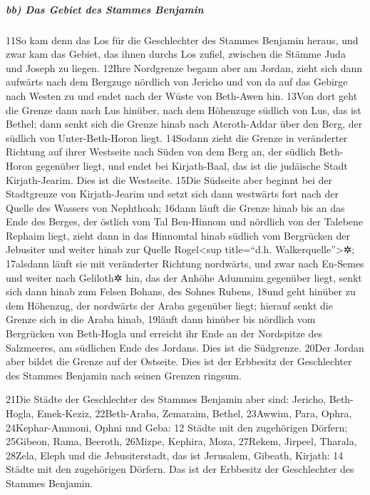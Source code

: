 \hypertarget{bb-das-gebiet-des-stammes-benjamin}{%
\subparagraph{bb) Das Gebiet des Stammes
Benjamin}\label{bb-das-gebiet-des-stammes-benjamin}}

11So kam denn das Los für die Geschlechter des Stammes Benjamin heraus,
und zwar kam das Gebiet, das ihnen durchs Los zufiel, zwischen die
Stämme Juda und Joseph zu liegen. 12Ihre Nordgrenze begann aber am
Jordan, zieht sich dann aufwärts nach dem Bergzuge nördlich von Jericho
und von da auf das Gebirge nach Westen zu und endet nach der Wüste von
Beth-Awen hin. 13Von dort geht die Grenze dann nach Lus hinüber, nach
dem Höhenzuge südlich von Lus, das ist Bethel; dann senkt sich die
Grenze hinab nach Ateroth-Addar über den Berg, der südlich von
Unter-Beth-Horon liegt. 14Sodann zieht die Grenze in veränderter
Richtung auf ihrer Westseite nach Süden von dem Berg an, der südlich
Beth-Horon gegenüber liegt, und endet bei Kirjath-Baal, das ist die
judäische Stadt Kirjath-Jearim. Dies ist die Westseite. 15Die Südseite
aber beginnt bei der Stadtgrenze von Kirjath-Jearim und setzt sich dann
westwärts fort nach der Quelle des Wassers von Nephthoah; 16dann läuft
die Grenze hinab bis an das Ende des Berges, der östlich vom Tal
Ben-Hinnom und nördlich von der Talebene Rephaim liegt, zieht dann in
das Hinnomtal hinab südlich vom Bergrücken der Jebusiter und weiter
hinab zur Quelle Rogel\textless sup title=``d.h.
Walkerquelle''\textgreater✲; 17alsdann läuft sie mit veränderter
Richtung nordwärts, und zwar nach En-Semes und weiter nach Geliloth✲
hin, das der Anhöhe Adummim gegenüber liegt, senkt sich dann hinab zum
Felsen Bohans, des Sohnes Rubens, 18und geht hinüber zu dem Höhenzug,
der nordwärts der Araba gegenüber liegt; hierauf senkt die Grenze sich
in die Araba hinab, 19läuft dann hinüber bis nördlich vom Bergrücken von
Beth-Hogla und erreicht ihr Ende an der Nordspitze des Salzmeeres, am
südlichen Ende des Jordans. Dies ist die Südgrenze. 20Der Jordan aber
bildet die Grenze auf der Ostseite. Dies ist der Erbbesitz der
Geschlechter des Stammes Benjamin nach seinen Grenzen ringsum.

21Die Städte der Geschlechter des Stammes Benjamin aber sind: Jericho,
Beth-Hogla, Emek-Keziz, 22Beth-Araba, Zemaraim, Bethel, 23Awwim, Para,
Ophra, 24Kephar-Ammoni, Ophni und Geba: 12 Städte mit den zugehörigen
Dörfern; 25Gibeon, Rama, Beeroth, 26Mizpe, Kephira, Moza, 27Rekem,
Jirpeel, Tharala, 28Zela, Eleph und die Jebusiterstadt, das ist
Jerusalem, Gibeath, Kirjath: 14 Städte mit den zugehörigen Dörfern. Das
ist der Erbbesitz der Geschlechter des Stammes Benjamin.

